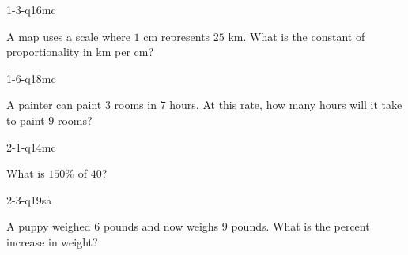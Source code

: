 
\begin{practiceQuestion}{1-3-q16}{mc}
\begin{questionText}
A map uses a scale where $1$ cm represents $25$ km. What is the constant of proportionality in km per cm?
\end{questionText}
\end{practiceQuestion}

\begin{practiceQuestion}{1-6-q18}{mc}
\begin{questionText}
A painter can paint $3$ rooms in $7$ hours. At this rate, how many hours will it take to paint $9$ rooms?
\end{questionText}
\end{practiceQuestion}

\begin{practiceQuestion}{2-1-q14}{mc}
\begin{questionText}
What is $150\%$ of $40$?
\end{questionText}
\end{practiceQuestion}

\begin{practiceQuestion}{2-3-q19}{sa}
\begin{questionText}
A puppy weighed $6$ pounds and now weighs $9$ pounds. What is the percent increase in weight?


\end{questionText}
\end{practiceQuestion}

